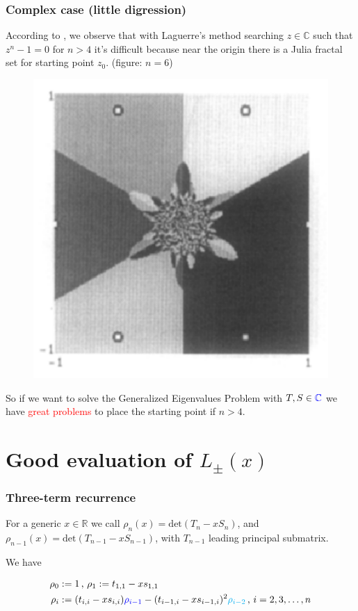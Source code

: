 \documentclass{beamer}
\newcommand{\R}{\mathbb{R}}
\newcommand{\C}{\mathbb{C}}
\newcommand{\deter}[1]{\mathrm{det}(#1)}
\newcommand{\tc}{ $ such that $ }
\theoremstyle{definition} \newtheorem{de}{Def}
\theoremstyle{remark} \newtheorem{os}[de]{Remark}
\theoremstyle{plain} \newtheorem{te}[de]{Teo}
\theoremstyle{plain} \newtheorem{co}[de]{Cor}
\theoremstyle{plain} \newtheorem{pr}[de]{Prop}
\theoremstyle{plain} \newtheorem{lem}[de]{Lemm}
\theoremstyle{remark} \newtheorem{rem}[de]{Remark}
\begin{document}
\begin{frame}[label=Julia]
  \frametitle{Complex case (little digression)}

  According to \cite{julia}, we observe that with Laguerre's method searching $z\in\C \tc z^n - 1 = 0$ for $n>4$ it's difficult because near the origin there is a Julia fractal set for starting point $z_0$. (figure: $n=6$)

\begin{figure}
  \centering
  \includegraphics[scale=0.3]{images/JuliaLaguerre.pdf}
\end{figure}

\pause

So if we want to solve the Generalized Eigenvalues Problem with $T,S\in\textcolor{blue}{\C}$ we have \textcolor{red}{great problems} to place the starting point if $n>4$. 

\end{frame}

\section{Good evaluation of $L_{\pm}(x)$}

\begin{frame}
  \frametitle{Three-term recurrence}
  For a generic $x\in\R$ we call $\rho_n(x) = \deter{T_n-x S_n}$,
  and $\rho_{n-1}(x) = \deter{T_{n-1}-x S_{n-1}}$, with $T_{n-1}$ leading principal submatrix. 

  We have

  \begin{align*}
    \rho_0 &:= 1\, \text{, } \rho_1:=t_{1,1}- x s_{1,1} \\
    \rho_i &:= (t_{i,i}- x s_{i,i})\textcolor{blue}{\rho_{i-1}} - (t_{i-1,i}-x s_{i-1,i})^2 \textcolor{cyan}{\rho_{i-2}}\, \text{, } i=2,3,\dots,n
  \end{align*}

\end{frame}
\end{document}
